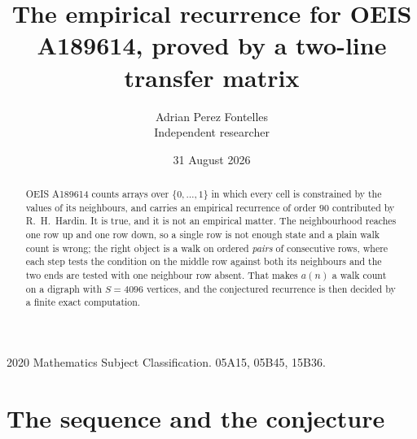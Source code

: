\documentclass[11pt,a4paper]{article}
\title{The empirical recurrence for OEIS A189614, proved by a two-line transfer matrix}
\author{Adrian Perez Fontelles\\ \small Independent researcher}
\date{31 August 2026}
\theoremstyle{plain}
\theoremstyle{definition}
\begin{document}
\maketitle

\begin{abstract}
OEIS A189614 counts arrays over $\{0,\dots,1\}$ in which every cell is constrained by the
values of its neighbours, and carries an empirical recurrence of order $90$ contributed
by R.~H.~Hardin. It is true, and it is not an empirical matter. The neighbourhood reaches one
row up and one row down, so a single row is not enough state and a plain walk count
is wrong; the right object is a walk on ordered \emph{pairs} of consecutive rows, where
each step tests the condition on the middle row against both its neighbours and the two
ends are tested with one neighbour row absent. That makes $a(n)$ a walk count on a digraph
with $S=4096$ vertices, and the conjectured recurrence is then decided by a finite exact
computation.
\end{abstract}

\noindent\small 2020 Mathematics Subject Classification. 05A15, 05B45, 15B36.\normalsize

\section{The sequence and the conjecture}
\end{document}
